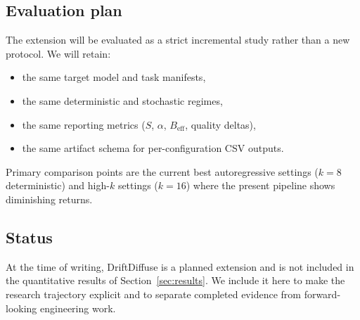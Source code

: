 \subsection{Evaluation plan}

The extension will be evaluated as a strict incremental study rather than a new
protocol. We will retain:
\begin{itemize}
  \item the same target model and task manifests,
  \item the same deterministic and stochastic regimes,
  \item the same reporting metrics ($S$, $\alpha$, $B_{\text{eff}}$, quality deltas),
  \item the same artifact schema for per-configuration CSV outputs.
\end{itemize}

Primary comparison points are the current best autoregressive settings
($k{=}8$ deterministic) and high-$k$ settings ($k{=}16$) where the present
pipeline shows diminishing returns.

\subsection{Status}

At the time of writing, DriftDiffuse is a planned extension and is not included
in the quantitative results of Section~\ref{sec:results}. We include it here to
make the research trajectory explicit and to separate completed evidence from
forward-looking engineering work.
